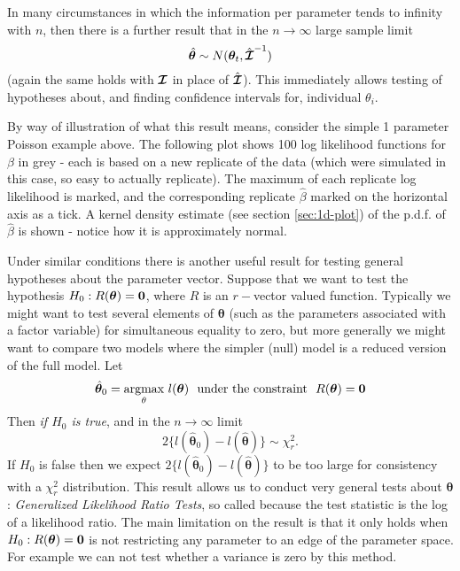 \documentclass[10pt] {article}
\newcommand{\eps}[3]
{{\begin{center}
 \rotatebox{#1}{\scalebox{#2}{\texttt{[image: \#3]}}}
 \end{center}}
}
\theoremstyle{definition}
\begin{document}
In many circumstances in which the information per parameter tends to infinity with $n$, then there is a further result that in the $n \to \infty$ large sample limit
$$
\hat {\bm \theta} \sim N({\bm \theta}_t,\hat{\bm{{\cal I}}}^{-1})
$$
(again the same holds with ${\bm{{\cal I}}}$ in place of $\hat{\bm{{\cal I}}}$). This immediately allows testing of hypotheses about, and finding confidence intervals for, individual $\theta_i$.  

By way of illustration of what this result means, consider the simple 1 parameter Poisson example above. The following plot shows 100 log likelihood functions for $\beta$ in grey - each is based on a new replicate of the data (which were simulated in this case, so easy to actually replicate). The maximum of each replicate log likelihood is marked, and the corresponding replicate $\hat \beta $ marked on the horizontal axis as a tick. A kernel density estimate (see section \ref{sec:1d-plot}) of the p.d.f. of $\hat \beta$ is shown - notice how it is approximately normal.
\eps{0}{.5}{fig-beta-dist-1.pdf}


Under similar conditions there is another useful result for testing general hypotheses about the parameter vector. Suppose that we want to test the hypothesis $H_0:R({\bm \theta}) = {\bf 0}$, where $R$ is an $r-$vector valued function. Typically we might want to test several elements of $\bm \theta$ (such as the parameters associated with a factor variable) for simultaneous equality to zero, but more generally we might want to compare two models where the simpler (null) model is a reduced version of the full model. Let
$$
\hat {\bm \theta}_0 = \underset{\theta}{\text{argmax}} ~l({\bm \theta}) ~~ \text{under the constraint} ~~ R({\bm \theta}) = {\bf 0}
$$  
Then {\em if $H_0$ is true}, and in the  $n\to \infty$ limit
$$
2\{l(\hat {\bm \theta}_0) - l(\hat {\bm \theta})\}\sim \chi^2_r.
$$
If $H_0$ is false then we expect $2\{l(\hat {\bm \theta}_0) - l(\hat {\bm \theta})\}$ to be too large for consistency with a $\chi^2_r$ distribution. This result allows us to conduct very general tests about $\bm \theta$: {\em Generalized Likelihood Ratio Tests}, so called because the test statistic is the log of a likelihood ratio. The main limitation on the result is that it only holds when  $H_0:R({\bm \theta}) = {\bf 0}$ is not restricting any parameter to an edge of the parameter space. For example we can not test whether a variance is zero by this method. 
\end{document}
